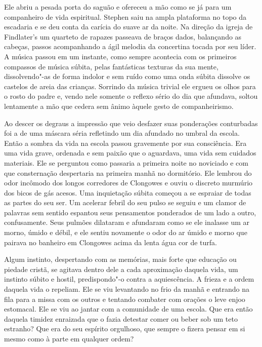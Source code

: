 Ele abriu a pesada porta do saguão e ofereceu a mão como se já para um
companheiro de vida espiritual. Stephen saiu na ampla plataforma no
topo da escadaria e se deu conta da carícia do suave ar da noite. Na
direção da igreja de Findlater’s um quarteto de
rapazes passeava de braços dados, balançando as cabeças, passos
acompanhando a ágil melodia da concertina tocada por seu líder. A
música passou em um instante, como sempre acontecia com os primeiros
compassos de música súbita, pelas fantásticas texturas da sua mente,
dissolvendo"-as de forma indolor e sem ruído como uma onda súbita
dissolve os castelos de areia das crianças. Sorrindo da música trivial
ele ergueu os olhos para o rosto do padre e, vendo nele somente o
reflexo sério do dia que afundava, soltou lentamente a mão que cedera
sem ânimo àquele gesto de companheirismo.

Ao descer os degraus a impressão que veio desfazer suas ponderações
conturbadas foi a de uma máscara séria refletindo um dia afundado no
umbral da escola. Então a sombra da vida na escola passou gravemente
por sua consciência. Era uma vida grave, ordenada e sem paixão que o
aguardava, uma vida sem cuidados materiais. Ele se perguntou como
passaria a primeira noite no noviciado e com que consternação
despertaria na primeira manhã no dormitório. Ele lembrou do odor
incômodo dos longos corredores de Clongowes e ouviu o discreto murmúrio
dos bicos de gás acesos. Uma inquietação súbita começou a se espraiar
de todas as partes do seu ser. Um acelerar febril do seu pulso se
seguiu e um clamor de palavras sem sentido espantou seus pensamentos
ponderados de um lado a outro, confusamente. Seus pulmões dilataram e
afundaram como se ele inalasse um ar morno, úmido e débil, e ele sentiu
novamente o odor do ar úmido e morno que pairava no banheiro em
Clongowes acima da lenta água cor de turfa.

Algum instinto, despertando com as memórias, mais forte que educação ou
piedade cristã, se agitava dentro dele a cada aproximação daquela vida,
um instinto súbito e hostil, predispondo"-o contra a aquiescência. A
frieza e a ordem daquela vida o repeliam. Ele se viu levantando no frio
da manhã e entrando na fila para a missa com os outros e tentando
combater com orações o leve enjoo estomacal. Ele se viu ao jantar com a
comunidade de uma escola. Que era então daquela timidez enraizada que o
fazia detestar comer ou beber sob um teto estranho? Que era do seu
espírito orgulhoso, que sempre o fizera pensar em si mesmo como à parte
em qualquer ordem?

